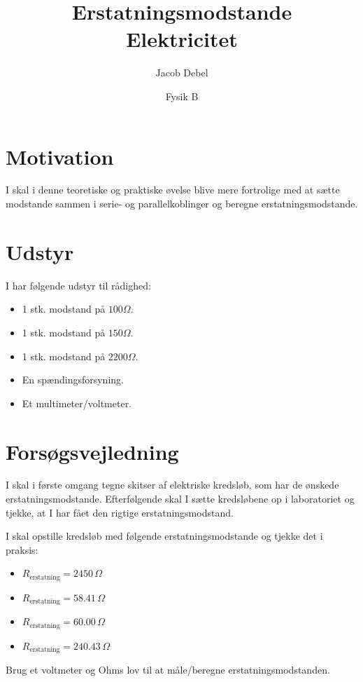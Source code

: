 \documentclass[a4paper, 12pt]{article}
\author{Jacob Debel}
\date{Fysik B}
\title{Erstatningsmodstande\\\medskip
\large Elektricitet}
\begin{document}
\maketitle
\section*{Motivation}
\label{sec:org1282f96}
I skal i denne teoretiske og praktiske øvelse blive mere fortrolige med at sætte modstande sammen i serie- og parallelkoblinger og beregne erstatningsmodstande.

\section*{Udstyr}
\label{sec:org7cf293b}
I har følgende udstyr til rådighed:
\begin{itemize}
\item 1 stk. modstand på \(100 \Omega\).
\item 1 stk. modstand på \(150 \Omega\).
\item 1 stk. modstand på \(2200 \Omega\).
\item En spændingsforsyning.
\item Et multimeter/voltmeter.
\end{itemize}

\section*{Forsøgsvejledning}
\label{sec:org31bb0ee}
I skal i første omgang tegne skitser af elektriske kredsløb, som har de ønskede erstatningsmodstande. Efterfølgende skal I sætte kredsløbene op i laboratoriet og tjekke, at I har fået den rigtige erstatningsmodstand.

I skal opstille kredsløb med følgende erstatningsmodstande og tjekke det i praksis:

\begin{itemize}
\item \(R_\text{erstatning} = 2450 \, \Omega\)
\item \(R_\text{erstatning} = 58.41\, \Omega\)
\item \(R_\text{erstatning} = 60.00\, \Omega\)
\item \(R_\text{erstatning} = 240.43 \, \Omega\)
\end{itemize}

Brug et voltmeter og Ohms lov til at måle/beregne erstatningsmodstanden.
\end{document}
